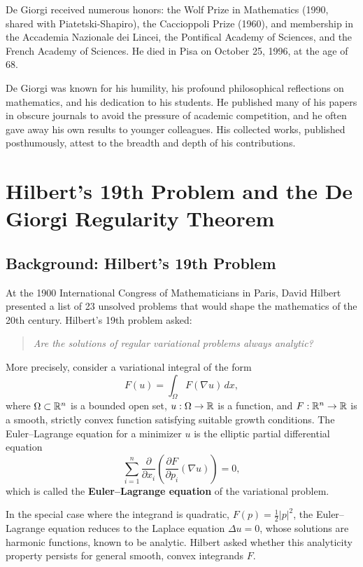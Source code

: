 De Giorgi received numerous honors: the Wolf Prize in Mathematics (1990, shared with Piatetski-Shapiro), the Caccioppoli Prize (1960), and membership in the Accademia Nazionale dei Lincei, the Pontifical Academy of Sciences, and the French Academy of Sciences. He died in Pisa on October 25, 1996, at the age of 68.

De Giorgi was known for his humility, his profound philosophical reflections on mathematics, and his dedication to his students. He published many of his papers in obscure journals to avoid the pressure of academic competition, and he often gave away his own results to younger colleagues. His collected works, published posthumously, attest to the breadth and depth of his contributions.

\section{Hilbert's 19th Problem and the De Giorgi Regularity Theorem}

\subsection{Background: Hilbert's 19th Problem}

At the 1900 International Congress of Mathematicians in Paris, David Hilbert presented a list of 23 unsolved problems that would shape the mathematics of the 20th century. Hilbert's 19th problem asked:

\begin{quote}
\it Are the solutions of regular variational problems always analytic?
\end{quote}

More precisely, consider a variational integral of the form
\[
F(u) = \int_\Omega F(\nabla u)\,dx,
\]
where \(\Omega \subset \mathbb{R}^n\) is a bounded open set, \(u: \Omega \to \mathbb{R}\) is a function, and \(F: \mathbb{R}^n \to \mathbb{R}\) is a smooth, strictly convex function satisfying suitable growth conditions. The Euler--Lagrange equation for a minimizer \(u\) is the elliptic partial differential equation
\[
\sum_{i=1}^n \frac{\partial}{\partial x_i} \left( \frac{\partial F}{\partial p_i}(\nabla u) \right) = 0,
\]
which is called the \textbf{Euler--Lagrange equation} of the variational problem.

In the special case where the integrand is quadratic, \(F(p) = \frac{1}{2}|p|^2\), the Euler--Lagrange equation reduces to the Laplace equation \(\Delta u = 0\), whose solutions are harmonic functions, known to be analytic. Hilbert asked whether this analyticity property persists for general smooth, convex integrands \(F\).

